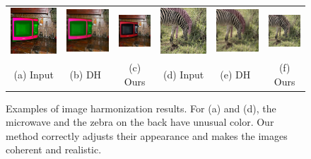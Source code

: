 \begin{figure}[h!]
\centering
\small
\begin{tabular}{cccccc}

  \includegraphics[width=.16\textwidth]{figures/hm/000000319696_input_image.jpg}&
  \includegraphics[width=.16\textwidth]{figures/hm/000000319696_synthesized_image.jpg}&
  \includegraphics[width=.16\textwidth]{figures/hm/000000319696_synthesized_image-1.jpg}&
  \includegraphics[width=.16\textwidth]{figures/hm/000000159311_input_image.jpg}&
  \includegraphics[width=.16\textwidth]{figures/hm/000000159311_synthesized_image.jpg}&
  \includegraphics[width=.16\textwidth]{figures/hm/000000159311_synthesized_image-1.jpg} \\
  (a) Input & (b) DH~\cite{tsai2017deep}  & (c) Ours & (d) Input & (e) DH~\cite{tsai2017deep}  & (f) Ours \\
\end{tabular}
\caption{Examples of image harmonization results. For (a) and (d), the microwave and the zebra on the back have unusual color. Our method correctly adjusts their appearance and makes the images coherent and realistic. }
\label{fig:harm}
\vspace{-10pt}
\end{figure}

